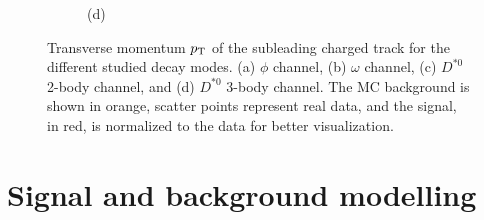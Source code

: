 \begin{figure}[!ht]
\begin{subfigure}[t]{0.50\mylength}
        \caption{\footnotesize (d)}
    \end{subfigure}%
\caption{Transverse momentum $p_\text{T}$ of the subleading charged track for the different studied decay modes. (a) $\phi$ channel, (b) $\omega$ channel, (c) $D^{*0}$ 2-body channel, and (d) $D^{*0}$ 3-body channel. The MC background is shown in orange, scatter points represent real data, and the signal, in red, is normalized to the data for better visualization.}
\label{fig:sublead_pt_data}
    \vspace*{-0.0cm}
\end{figure}

\section{Signal and background modelling }\label{sec:modelling}

